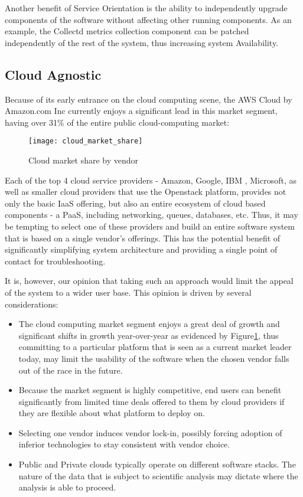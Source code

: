 Another benefit of Service Orientation is the ability to independently upgrade components of the software without affecting other running components. As an example, the Collectd metrics collection component can be patched independently of the rest of the system, thus increasing system Availability.

\subsection {Cloud Agnostic}

Because of its early entrance on the cloud computing scene, the AWS Cloud by Amazon.com Inc currently enjoys a significant lead in this market segment, having over 31\% of the entire public cloud-computing market:

\begin{figure}[h]
\texttt{[image: cloud\_market\_share]}
\centering
\caption {Cloud market share by vendor}
\label{fig:cloud_market_share}
\end{figure}

Each of the top 4 cloud service providers - Amazon, Google, IBM , Microsoft, as well as smaller cloud providers that use the Openstack platform, provides not only the basic IaaS offering, but also an entire ecosystem of cloud based components - a PaaS, including networking, queues, databases, etc. Thus, it may be tempting to select one of these providers and build an entire software system that is based on a single vendor's offerings. This has the potential benefit of significantly simplifying system architecture and providing a single point of contact for troubleshooting.

It is, however, our opinion that taking such an approach would limit the appeal of the system to a wider user base. This opinion is driven by several considerations:

\begin{itemize}
\item The cloud computing market segment enjoys a great deal of growth and significant shifts in growth year-over-year as evidenced by Figure\ref{fig:cloud_market_share}, thus committing to a particular platform that is seen as a current market leader today, may limit the usability of the software when the chosen vendor falls out of the race in the future.
\item Because the market segment is highly competitive, end users can benefit significantly from limited time deals offered to them by cloud providers if they are flexible about what platform to deploy on.
\item Selecting one vendor induces vendor lock-in, possibly forcing adoption of inferior technologies to stay consistent with vendor choice.
\item Public and Private clouds typically operate on different software stacks. The nature of the data that is subject to scientific analysis may dictate where the analysis is able to proceed. 
\end{itemize}

